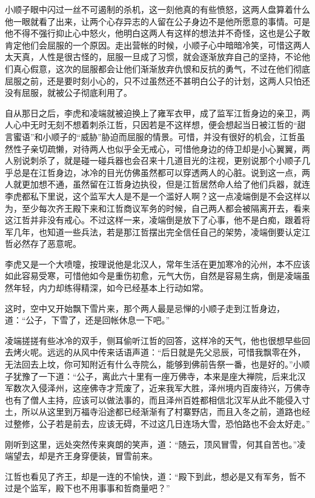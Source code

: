 小顺子眼中闪过一丝不可遏制的杀机，这一刻他真的有些愤怒，这两人盘算着什么他一眼就看了出来，让两个心存异志的人留在公子身边不是他所愿意的事情。可是他不得不强行抑止心中怒火，他明白这两人有这样的想法并不奇怪，这也是公子敢肯定他们会屈服的一个原因。走出营帐的时候，小顺子心中暗暗冷笑，可惜这两人太天真，人性是很古怪的，屈服一旦成了习惯，就会逐渐放弃自己的坚持，不论他们真心假意，这次的屈服都会让他们渐渐放弃仇恨和反抗的勇气，不过在他们彻底屈服之前，还是要时刻小心的，只不过虽然还不甚明白公子的计划，这两人只怕还没有屈服，就被公子彻底利用了。

自从那日之后，李虎和凌端就被迫换上了雍军衣甲，成了监军江哲身边的亲卫，两人心中无时无刻不想着刺杀江哲，只因若是不这样想，便会想起当日被江哲的“甜言蜜语”和小顺子的“威胁”胁迫而屈服的情景。可惜，并没有很好的机会，江哲虽然性子亲切疏懒，对待两人也似乎全无戒心，可惜他身边的侍卫却是小心翼翼，两人别说刺杀了，就是碰一碰兵器也会召来十几道目光的注视，更别说那个小顺子几乎总是在江哲身边，冰冷的目光仿佛虽然都可以穿透两人的心脏。说到这一点，两人就更加想不通，虽然留在江哲身边执役，但是江哲居然命人给了他们兵器，就连李虎都私下里说，这个监军大人是不是一个滥好人啊？这一点凌端倒是不会这样以为，至少每次齐王殿下来和江哲商议军务的时候，自己两人都会被隔离开去，看来这江哲并非没有戒心。不过这样一来，凌端倒是放下了心事，他不是白痴，跟着将军几年，也知道一些兵法，若是那江哲摆出完全信任自己的架势，凌端倒要认定江哲必然存了恶意呢。

李虎又是一个大喷嚏，按理说他是北汉人，常年生活在更加寒冷的沁州，本不应该如此容易受寒，可惜他如今是重伤初愈，元气大伤，自然是容易生病，倒是凌端虽然年轻，内力却练得精深，如今已经基本上行动如常。

这时，空中又开始飘下雪片来，那个两人最是忌惮的小顺子走到江哲身边，道：“公子，下雪了，还是回帐休息一下吧。”

凌端搓搓有些冰冷的双手，侧耳偷听江哲的回答，这样冷的天气，他也很想早些回去烤火呢。远远的从风中传来话语声道：“后日就是先父忌辰，可惜我飘零在外，无法回去上坟，你可知附近有什么寺院么，能够到佛前告祭一番，也是好的。”小顺子犹豫了一下道：“公子，离此六十里有一座万佛寺，本来是座大禅院，后来北汉军数次入侵泽州，这座佛寺才荒废了，近来我军大胜，泽州境内百废待兴，万佛寺也有了僧人主持，应该可以做法事的，而且泽州百姓都相信北汉军从此不能侵入寸土，所以从这里到万福寺沿途都已经渐渐有了村寨野店，而且入冬之前，道路也经过整修，公子若是前去，应该无碍，不过这几日连场大雪，恐怕路也不会太好走。”

刚听到这里，远处突然传来爽朗的笑声，道：“随云，顶风冒雪，何其自苦也。”凌端望去，却是齐王身穿便装，冒雪前来。

江哲也看见了齐王，却是一连的不愉快，道：“殿下到此，想必是又有军务，哲不过是个监军，殿下也不用事事和哲商量吧？”


